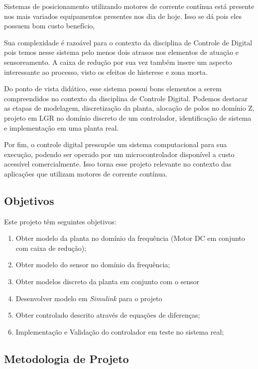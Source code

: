 \documentclass[a4paper,11pt]{article}
\begin{document}
Sistemas de posicionamento utilizando motores de corrente contínua está presente nos mais variados equipamentos presentes nos dia de hoje. Isso se dá pois eles possuem bom custo benefício, 

Sua complexidade é razoável para o contexto da disciplina de Controle de Digital pois temos nesse sistema pelo menos dois atrasos nos elementos de atuação e sensoreamento. A caixa de redução por sua vez também insere um aspecto interessante ao processo, visto os efeitos de histerese e zona morta.

Do ponto de vista didático, esse sistema possui bons elementos a serem compreendidos no contexto da disciplina de Controle Digital. Podemos destacar as etapas de modelagem, discretização da planta, alocação de polos no domínio Z, projeto em LGR no domínio discreto de um controlador, identificação de sistema e implementação em uma planta real.

Por fim, o controle digital pressupõe um sistema computacional para sua execução, podendo ser operado por um microcontrolador disponível a custo acessível comercialmente. Isso torna esse projeto relevante no contexto das aplicações que utilizam motores de corrente contínua.

\subsection{Objetivos}

Este projeto têm seguintes objetivos:

 \begin{enumerate}
   \item Obter modelo da planta no domínio da frequência (Motor DC em conjunto com caixa de redução);
   \item Obter modelo do sensor no domínio da frequência;
   \item Obter modelos discreto da planta em conjunto com o sensor
   \item Desenvolver modelo em \textit{Simulink} para o projeto
   \item Obter controlado descrito através de equações de diferenças;
   \item Implementação e Validação do controlador em teste no sistema real;
 \end{enumerate}

\subsection{Metodologia de Projeto}
\end{document}
